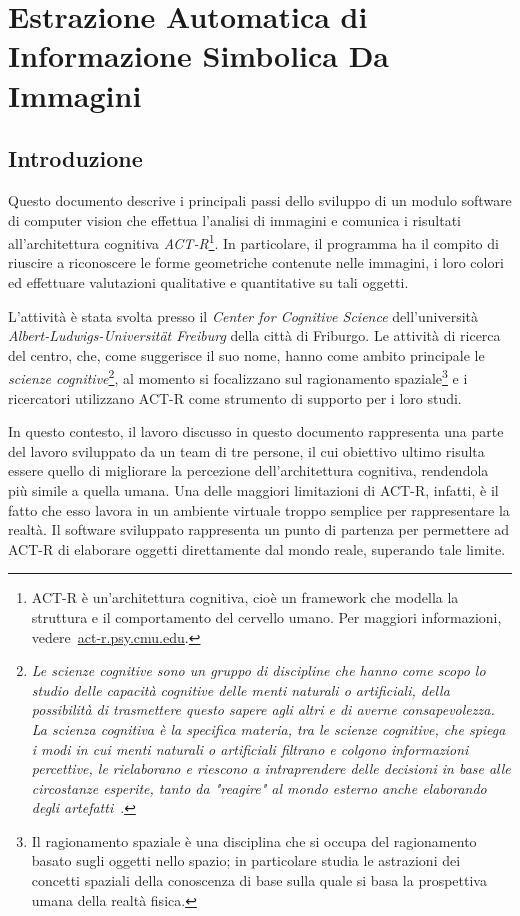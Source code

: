 \chapter*{Estrazione Automatica di Informazione Simbolica Da Immagini}
	
	\section*{Introduzione}
	Questo documento descrive i principali passi dello sviluppo di un modulo software di computer vision che effettua l'analisi di immagini e comunica i risultati all'architettura cognitiva \mbox{\emph{ACT-R}}\footnote{ACT-R è un'architettura cognitiva, cioè un framework che modella la struttura e il comportamento del cervello umano. Per maggiori informazioni, vedere~\url{act-r.psy.cmu.edu}.}.
	In particolare, il programma ha il compito di riuscire a riconoscere le forme geometriche contenute nelle immagini, i loro colori ed effettuare valutazioni qualitative e quantitative su tali oggetti.

	L'attività è stata svolta presso il \emph{Center for Cognitive Science} dell'università \emph{Albert-Ludwigs-Universität Freiburg} della città di Friburgo.
	Le attività di ricerca del centro, che, come suggerisce il suo nome, hanno come ambito principale le \emph{scienze cognitive}\footnote{\emph{Le scienze cognitive sono un gruppo di discipline che hanno come scopo lo studio delle capacità cognitive delle menti naturali o artificiali, della possibilità di trasmettere questo sapere agli altri e di averne consapevolezza. La scienza cognitiva è la specifica materia, tra le scienze cognitive, che spiega i modi in cui menti naturali o artificiali filtrano e colgono informazioni percettive, le rielaborano e riescono a intraprendere delle decisioni in base alle circostanze esperite, tanto da "reagire" al mondo esterno anche elaborando degli artefatti}~\cite{legrenzi2005prima}.}, 	
	al momento si focalizzano sul ragionamento spaziale\footnote{Il ragionamento spaziale è una disciplina che si occupa del ragionamento basato sugli oggetti nello spazio; in particolare studia le astrazioni dei concetti spaziali della conoscenza di base sulla quale si basa la prospettiva umana della realtà fisica.} e i ricercatori utilizzano ACT-R come strumento di supporto per i loro studi. 
	
	In questo contesto, il lavoro discusso in questo documento rappresenta una parte del lavoro sviluppato da un team di tre persone, il cui obiettivo ultimo risulta essere quello di migliorare la percezione dell'architettura cognitiva, rendendola più simile a quella umana.  
	Una delle maggiori limitazioni di \mbox{ACT-R}, infatti, è il fatto che esso lavora in un ambiente virtuale troppo semplice per rappresentare la realtà. 
	Il software sviluppato rappresenta un punto di partenza per permettere ad \mbox{ACT-R} di elaborare oggetti direttamente dal mondo reale, superando tale limite.
	 

